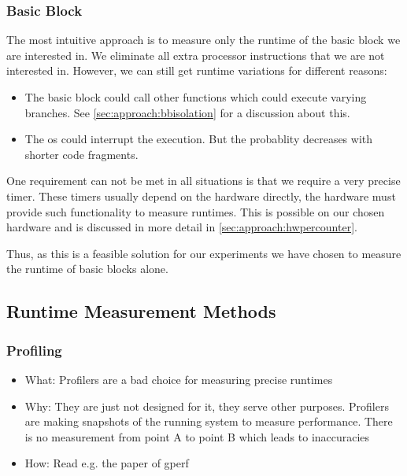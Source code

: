 \subsubsection{Basic Block}
\tobechecked
The most intuitive approach is to measure only the runtime of the basic block we are interested in.
We eliminate all extra processor instructions that we are not interested in.
However, we can still get runtime variations for different reasons:
\begin{itemize}
    \item The basic block could call other functions which could execute varying branches. 
          See \cref{sec:approach:bbisolation} for a discussion about this.
    \item The \ac{os} could interrupt the execution. 
          But the probablity decreases with shorter code fragments.
\end{itemize}

One requirement can not be met in all situations is that we require a very precise timer.
These timers usually depend on the hardware directly, \ie the hardware must provide such functionality to measure runtimes.
This is possible on our chosen hardware and is discussed in more detail in \cref{sec:approach:hwpercounter}.

Thus, as this is a feasible solution for our experiments we have chosen to measure the runtime of basic blocks alone.
    
\subsection{Runtime Measurement Methods}
\label{sec:approach:datageneration:runtime_methods}
\subsubsection{Profiling}
\begin{itemize}
    \item What: Profilers are a bad choice for measuring precise runtimes
    \item Why: They are just not designed for it, they serve other purposes.
        Profilers are making snapshots of the running system to measure performance. 
        There is no measurement from point A to point B which leads to inaccuracies
    \item How: Read e.g. the paper of gperf \cite{graham1982gprof}
\end{itemize}
